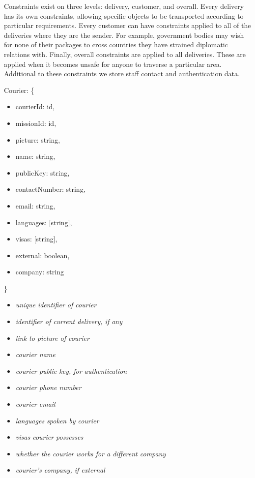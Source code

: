 \begin{flushleft}
Constraints exist on three levels: delivery, customer, and overall. Every delivery has its own constraints, allowing specific objects to be transported according to particular requirements. Every customer can have constraints applied to all of the deliveries where they are the sender. For example, government bodies may wish for none of their packages to cross countries they have strained diplomatic relations with. Finally, overall constraints are applied to all deliveries. These are applied when it becomes unsafe for anyone to traverse a particular area. Additional to these constraints we store staff contact and authentication data.
\end{flushleft}
\begin{minipage}{6.5cm}
    Courier: \{
    \begin{itemize}
        \itemsep-0.5em
        \item[] courierId: id,
        \item[] missionId: id,
        \item[] picture: string,
        \item[] name: string,
        \item[] publicKey: string,
        \item[] contactNumber: string,
        \item[] email: string,
        \item[] languages: [string],
        \item[] visas: [string],
        \item[] external: boolean,
        \item[] company: string
    \end{itemize}
    \}
\end{minipage}
\begin{minipage}{10cm}
    \hspace{1cm}
    \begin{itemize}
        \itemsep-0.5em
        \item[] \textit{unique identifier of courier}
        \item[] \textit{identifier of current delivery, if any}
        \item[] \textit{link to picture of courier}
        \item[] \textit{courier name}
        \item[] \textit{courier public key, for authentication}
        \item[] \textit{courier phone number}
        \item[] \textit{courier email}
        \item[] \textit{languages spoken by courier}
        \item[] \textit{visas courier possesses}
        \item[] \textit{whether the courier works for a different company}
        \item[] \textit{courier's company, if external}
    \end{itemize}
    \hspace{1cm}
\end{minipage}
